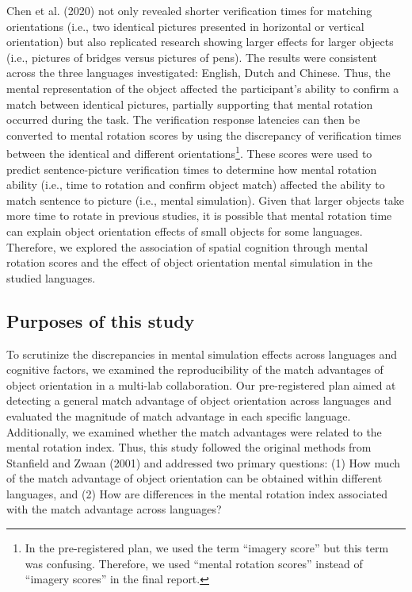 \documentclass[
  man,floatsintext]{apa7}
\begin{document}
Chen et al. (2020) not only revealed shorter verification times for
matching orientations (i.e., two identical pictures presented in
horizontal or vertical orientation) but also replicated research showing
larger effects for larger objects (i.e., pictures of bridges versus
pictures of pens). The results were consistent across the three
languages investigated: English, Dutch and Chinese. Thus, the mental
representation of the object affected the participant's ability to
confirm a match between identical pictures, partially supporting that
mental rotation occurred during the task. The verification response
latencies can then be converted to mental rotation scores by using the
discrepancy of verification times between the identical and different
orientations\footnote{In the pre-registered plan, we used the term ``imagery score'' but
  this term was confusing. Therefore, we used ``mental rotation scores''
  instead of ``imagery scores'' in the final report.}. These scores were used to predict sentence-picture
verification times to determine how mental rotation ability (i.e., time
to rotation and confirm object match) affected the ability to match
sentence to picture (i.e., mental simulation). Given that larger objects
take more time to rotate in previous studies, it is possible that mental
rotation time can explain object orientation effects of small objects
for some languages. Therefore, we explored the association of spatial
cognition through mental rotation scores and the effect of object
orientation mental simulation in the studied languages.

\hypertarget{purposes-of-this-study}{%
\subsection{Purposes of this study}\label{purposes-of-this-study}}

To scrutinize the discrepancies in mental simulation effects across
languages and cognitive factors, we examined the reproducibility of the
match advantages of object orientation in a multi-lab collaboration. Our
pre-registered plan aimed at detecting a general match advantage of
object orientation across languages and evaluated the magnitude of match
advantage in each specific language. Additionally, we examined whether
the match advantages were related to the mental rotation index. Thus,
this study followed the original methods from Stanfield and Zwaan (2001) and
addressed two primary questions: (1) How much of the match advantage of
object orientation can be obtained within different languages, and (2)
How are differences in the mental rotation index associated with the
match advantage across languages?
\end{document}
